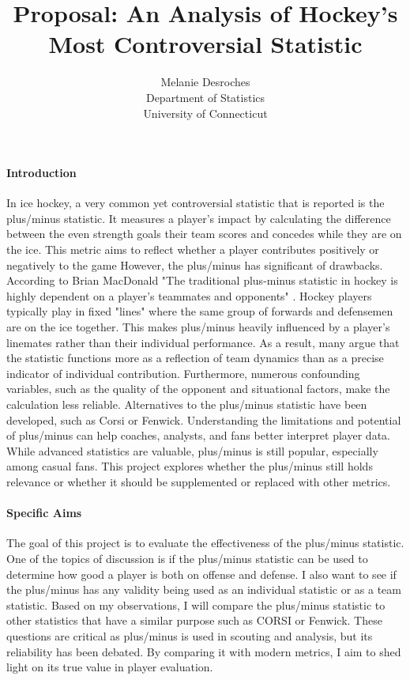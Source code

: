 \documentclass[12pt]{article}
\title{Proposal: An Analysis of Hockey's Most Controversial Statistic}
\author{Melanie Desroches\\
  Department of Statistics\\
  University of Connecticut
}
\begin{document}
\maketitle


\paragraph{Introduction}
In ice hockey, a very common yet controversial statistic that is reported is the plus/minus statistic. It measures a player's impact 
by calculating the difference between the even strength goals their team scores and concedes while they are on the ice. This metric
aims to reflect whether a player contributes positively or negatively to the game However, the plus/minus has significant of drawbacks. 
According to Brian MacDonald "The traditional plus-minus statistic in hockey is highly dependent on a player’s teammates and opponents" 
\cite{Macdonald_2011}. Hockey players typically play in fixed "lines" where the same group of forwards and defensemen are on the ice 
together. This makes plus/minus heavily influenced by a player's linemates rather than their individual performance. As a result, many
argue that the statistic functions more as a reflection of team dynamics than as a precise indicator of individual contribution. 
Furthermore, numerous confounding variables, such as the quality of the opponent and situational factors, make the calculation less 
reliable. Alternatives to the plus/minus statistic have been developed, such as Corsi or Fenwick. Understanding the limitations and
potential of plus/minus can help coaches, analysts, and fans better interpret player data. While advanced statistics are valuable, 
plus/minus is still popular, especially among casual fans. This project explores whether the plus/minus still holds relevance or 
whether it should be supplemented or replaced with other metrics.


\paragraph{Specific Aims}
The goal of this project is to evaluate the effectiveness of the plus/minus statistic. One of the topics of discussion is if the 
plus/minus statistic can be used to determine how good a player is both on offense and defense. I also want to see if the plus/minus 
has any validity being used as an individual statistic or as a team statistic. Based on my observations, I will compare the plus/minus 
statistic to other statistics that have a similar purpose such as CORSI or Fenwick. These questions are critical as plus/minus is used 
in scouting and analysis, but its reliability has been debated. By comparing it with modern metrics, I aim to shed light on its true 
value in player evaluation.
\end{document}
